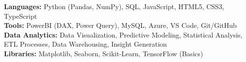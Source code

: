 \noindent\textbf{Languages:} Python (Pandas, NumPy), SQL, JavaScript, HTML5, CSS3, TypeScript \\
\vspace{2pt}
\noindent\textbf{Tools:} PowerBI (DAX, Power Query), MySQL, Azure, VS Code, Git/GitHub \\
\vspace{2pt}
\noindent\textbf{Data Analytics:} Data Visualization, Predictive Modeling, Statistical Analysis, ETL Processes, Data Warehousing, Insight Generation \\
\vspace{2pt}
\noindent\textbf{Libraries:} Matplotlib, Seaborn, Scikit-Learn, TensorFlow (Basics)
